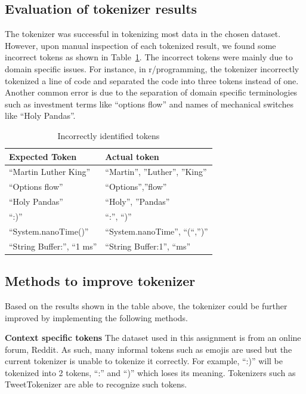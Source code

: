 \documentclass[sigconf,nonacm=true]{acmart}
\begin{document}
\subsection{Evaluation of tokenizer results}
The tokenizer was successful in tokenizing most data in the chosen dataset. However, upon manual inspection of each tokenized result, we found some incorrect tokens as shown in Table~\ref{tab:token}. The incorrect tokens were mainly due to domain specific issues. For instance, in r/programming, the tokenizer incorrectly tokenized a line of code and separated the code into three tokens instead of one. Another common error is due to the separation of domain specific terminologies such as investment terms like “options flow” and names of mechanical switches like “Holy Pandas”.

\begin{table}[h]
	\begin{tabular}{|l|l|}
	\hline
	 {\bf Expected Token} &  {\bf Actual token} \\ \hline
	 “Martin Luther King”& “Martin”, ”Luther”, ”King”  \\ \hline
	 “Options flow” &  “Options”,”flow” \\ \hline
	 “Holy Pandas”& “Holy”, ”Pandas” \\ \hline
	“:)” &  “:”, “)”\\ \hline
	 “System.nanoTime()”& “System.nanoTime”, “(“,”)” \\ \hline
	“String Buffer:”, “1 ms”  &  “String Buffer:1”, “ms”\\ \hline
	\end{tabular}
	\caption{Incorrectly identified tokens}
	\label{tab:token}
\end{table}


\subsection{Methods to improve tokenizer}
Based on the results shown in the table above, the tokenizer could be further improved by implementing the following methods. \medskip


{\bf Context specific tokens}
The dataset used in this assignment is from an online forum, Reddit. As such, many informal tokens such as emojis are used but the current tokenizer is unable to tokenize it correctly. For example, “:)” will be tokenized into 2 tokens, “:” and “)” which loses its meaning. Tokenizers such as TweetTokenizer are able to recognize such tokens.\bigskip
\end{document}
